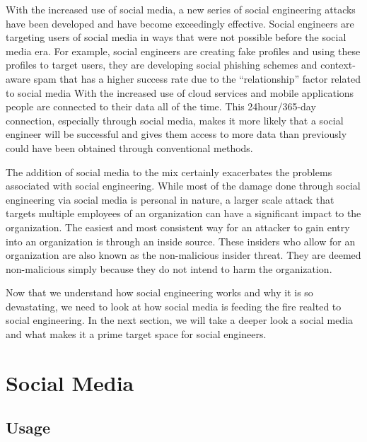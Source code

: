\documentclass[conference]{IEEEtran}
\begin{document}
With the increased use of social media, a new series of social engineering attacks have been developed and have become exceedingly effective. Social engineers are targeting users of social media in ways that were not possible before the social media era.  For example, social engineers are creating fake profiles and using these profiles to target users, they are developing social phishing schemes and context-aware spam that has a higher success rate due to the “relationship” factor related to social media\cite{krombholz_hobel_huber_weippl_2015} With the increased use of cloud services and mobile applications people are connected to their data all of the time.  This 24hour/365-day connection, especially through social media, makes it more likely that a social engineer will be successful and gives them access to more data than previously could have been obtained through conventional methods.  

The addition of social media to the mix certainly exacerbates the problems associated with social engineering. While most of the damage done through social engineering via social media is personal in nature, a larger scale attack that targets multiple employees of an organization can have a significant impact to the organization\cite {Mills:2009:ASE:1940976.1941003}. The easiest and most consistent way for an attacker to gain entry into an organization is through an inside source.  These insiders who allow for an organization are also known as the non-malicious insider threat.  They are deemed non-malicious simply because they do not intend to harm the organization.   

Now that we understand how social engineering works and why it is so devastating, we need to look at how social media is feeding the fire realted to social engineering.  In the next section, we will take a deeper look a social media and what makes it a prime target space for social engineers. 
\section{Social Media}

\subsection{Usage}
\end{document}
